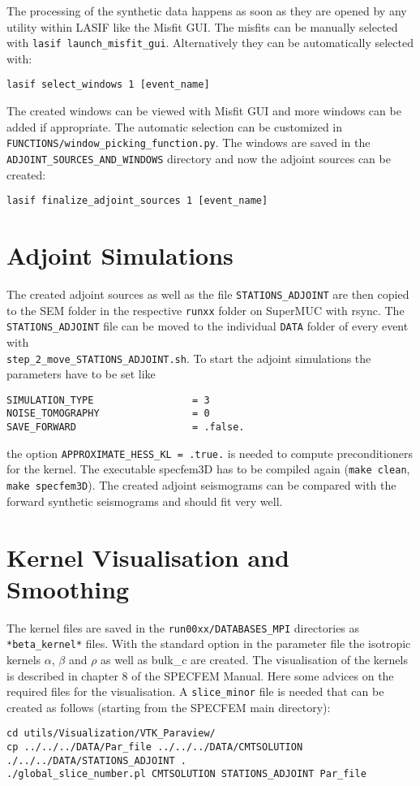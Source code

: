 The processing of the synthetic data happens as soon as they are opened
by any utility within LASIF like the Misfit GUI.
The misfits can be manually selected with \texttt{lasif launch\_misfit\_gui}.
Alternatively they can be automatically selected with:
\begin{lstlisting} 
lasif select_windows 1 [event_name]
\end{lstlisting}
The created windows can be viewed with Misfit GUI and more windows can be added
if appropriate.
The automatic selection can be customized in \\ \texttt{FUNCTIONS/window\_picking\_function.py}. 
The windows are saved in the \\
\texttt{ADJOINT\_SOURCES\_AND\_WINDOWS} directory
and now the adjoint sources can be created:
\begin{lstlisting} 
lasif finalize_adjoint_sources 1 [event_name]
\end{lstlisting}

\section{Adjoint Simulations}
The created adjoint sources as well as the file \texttt{STATIONS\_ADJOINT} 
are then copied to the SEM folder in the respective \texttt{runxx} folder 
on SuperMUC with rsync. 
The \texttt{STATIONS\_ADJOINT} file can be moved to the individual 
\texttt{DATA} folder of every event with\\ \texttt{step\_2\_move\_STATIONS\_ADJOINT.sh}.
To start the adjoint simulations the parameters have to be set like
\begin{lstlisting} 
SIMULATION_TYPE                 = 3        
NOISE_TOMOGRAPHY                = 0        
SAVE_FORWARD                    = .false.   
\end{lstlisting}

the option \texttt{APPROXIMATE\_HESS\_KL = .true.} is needed to compute 
preconditioners for the kernel.
The executable specfem3D has to be compiled again (\texttt{make clean}, \texttt{make specfem3D}).
The created adjoint seismograms can be compared with the forward synthetic
seismograms and should fit very well.


\section{Kernel Visualisation and Smoothing}

The kernel files are saved in the \texttt{run00xx/DATABASES\_MPI} directories
as \texttt{*beta\_kernel*} files. 
With the standard option in the parameter file the isotropic kernels
$\alpha$, $\beta$ and $\rho$ as well as bulk\_c are created.
The visualisation of the kernels is described in chapter 8 of the 
SPECFEM Manual. Here some advices on the required files for the visualisation.
A \texttt{slice\_minor} file is needed that can be created as follows
(starting from the SPECFEM main directory):
\begin{lstlisting} 
cd utils/Visualization/VTK_Paraview/
cp ../../../DATA/Par_file ../../../DATA/CMTSOLUTION ./../../DATA/STATIONS_ADJOINT .
./global_slice_number.pl CMTSOLUTION STATIONS_ADJOINT Par_file
\end{lstlisting}


